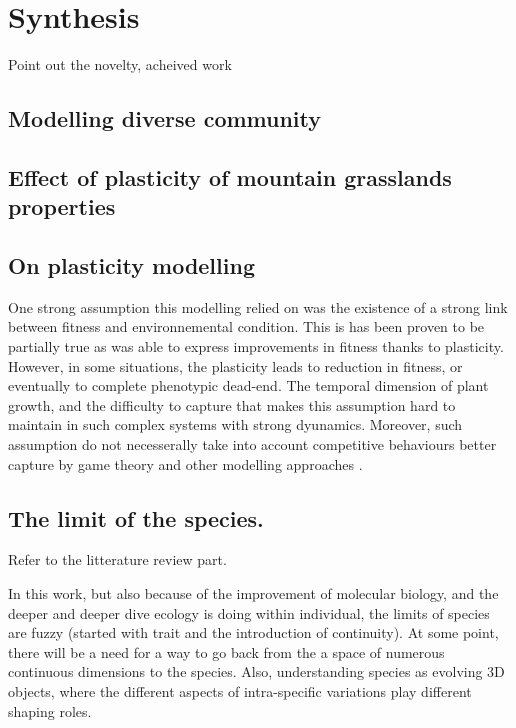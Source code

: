 

\chapter{Synthesis}

Point out the novelty, acheived work 

\section{Modelling diverse community}

\section{Effect of plasticity of mountain grasslands properties}



\section{On plasticity modelling}
One strong assumption this modelling relied on was the existence of a strong link between fitness and environnemental condition. This is has been proven to be partially true as \model was able to express improvements in fitness thanks to plasticity. However, in some situations, the plasticity leads to reduction in fitness, or eventually to complete phenotypic dead-end. The temporal dimension of plant growth, and the difficulty to capture that makes this assumption hard to maintain in such complex systems with strong dyunamics. Moreover, such assumption do not necesserally take into account competitive behaviours better capture by game theory and other modelling approaches \cite{farrior_resource_2011, dybzinski_evolutionarily_2011}.

\section{The limit of the species.}

Refer to the litterature review part.

In this work, but also because of the improvement of molecular biology, and the deeper and deeper dive ecology is doing within individual, the limits of species are fuzzy (started with trait and the introduction of continuity). At some point, there will be a need for a way to go back from the a space of numerous continuous dimensions to the species. Also, understanding species as evolving 3D objects, where the different aspects of intra-specific variations play different shaping roles.